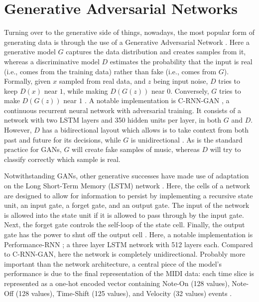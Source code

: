 \documentclass[a4paper]{book}
\begin{document}
\section{Generative Adversarial Networks} \label{sec:generative}

Turning over to the generative side of things, nowadays, the most popular form of generating data is through the use of a Generative Adversarial Network \parencite[GAN;][]{goodfellow_generative_2014}. Here a generative model $G$ captures the data distribution and creates samples from it, whereas a discriminative model $D$ estimates the probability that the input is real (i.e., comes from the training data) rather than fake (i.e., comes from $G$). Formally, given $x$ sampled from real data, and $z$ being input noise, $D$ tries to keep $D(x)$ near $1$, while making $D(G(z))$ near $0$. Conversely, $G$ tries to make $D(G(z))$ near $1$ \parencite{goodfellow_nips_2016}. A notable implementation is C-RNN-GAN \parencite{mogren_c-rnn-gan_2016}, a continuous recurrent neural network with adversarial training. It consists of a network with two LSTM layers and 350 hidden units per layer, in both $G$ and $D$. However, $D$ has a bidirectional layout which allows is to take context from both past and future for its decisions, while $G$ is unidirectional \parencite{mogren_c-rnn-gan_2016}. As is the standard practice for GANs, $G$ will create fake samples of music, whereas $D$ will try to classify correctly which sample is real.

Notwithstanding GANs, other generative successes have made use of adaptation on the Long Short-Term Memory (LSTM) network \parencite{hochreiter_long_1997}. Here, the cells of a network are designed to allow for information to persist by implementing a recursive state unit, an input gate, a forget gate, and an output gate. The input of the network is allowed into the state unit if it is allowed to pass through by the input gate. Next, the forget gate controls the self-loop of the state cell. Finally, the output gate has the power to shut off the output cell \parencite{goodfellow_deep_2016}. Here, a notable implementation is Performance-RNN \parencite{oore_this_2018}; a three layer LSTM network with 512 layers each. Compared to C-RNN-GAN, here the network is completely unidirectional. Probably more important than the network architecture, a central piece of the model's performance is due to the final representation of the MIDI data: each time slice is represented as a one-hot encoded vector containing Note-On (128 values), Note-Off (128 values), Time-Shift (125 values), and Velocity (32 values) events \parencite{oore_this_2018}. 
\end{document}
